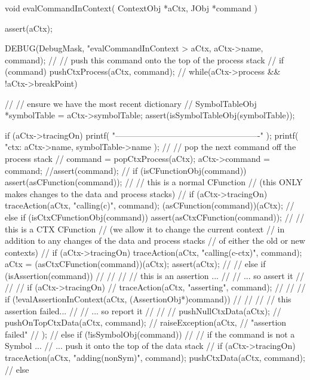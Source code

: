 \startCCode
void evalCommandInContext(
  ContextObj *aCtx,
  JObj       *command
) {
  assert(aCtx);
  
  DEBUG(DebugMask, "evalCommandInContext > %
    aCtx, aCtx->name, command);
  //
  // push this command onto the top of the process stack
  //
  if (command) pushCtxProcess(aCtx, command);
  //
  while(aCtx->process && !aCtx->breakPoint) {
    //
    // ensure we have the most recent dictionary
    //
    SymbolTableObj *symbolTable = aCtx->symbolTable;
    assert(isSymbolTableObj(symbolTable));
    
    if (aCtx->tracingOn) {
      printf(
        "\n----------------------------------------------------\n"
      );
      printf(
        "ctx: %
        aCtx->name, symbolTable->name
      );
    }
    //
    // pop the next command off the process stack
    //
    command = popCtxProcess(aCtx);
    aCtx->command = command;
    //assert(command);
    //
    if (isCFunctionObj(command)) {
      assert(asCFunction(command));
      //
      // this is a normal CFunction
      // (this ONLY makes changes to the data and process stacks)
      //
      if (aCtx->tracingOn)
        traceAction(aCtx, "calling(c)", command);
      (asCFunction(command))(aCtx);
      //
    } else if (isCtxCFunctionObj(command)) {
        assert(asCtxCFunction(command));
        //
        // this is a CTX CFunction
        // (we allow it to change the current context
        //  in addition to any changes of the data and process stacks
        //  of either the old or new contexts)
        //
        if (aCtx->tracingOn) 
          traceAction(aCtx, "calling(c-ctx)", command);
        aCtx = (asCtxCFunction(command))(aCtx);
        assert(aCtx);
        //    
//    } else if (isAssertion(command)) {
//      //
//      // this is an assertion ...
//      //   ... so assert it 
//      //
//      if (aCtx->tracingOn) 
//        traceAction(aCtx, "asserting", command);
//      //
//      if (!evalAssertionInContext(aCtx, (AssertionObj*)command)) {
//        //
//        // this assertion failed... 
//        //   ... so report it
//        //
//        pushNullCtxData(aCtx);
//        pushOnTopCtxData(aCtx, command);
//        raiseException(aCtx,
//          "assertion failed"
//        );
//      }
    } else if (!isSymbolObj(command)) {
      //
      // if the command is not a Symbol ...
      //  ...  push it onto the top of the data stack
      //
      if (aCtx->tracingOn)
        traceAction(aCtx, "adding(nonSym)", command);
      pushCtxData(aCtx, command);
      //
   } else {
}}}

